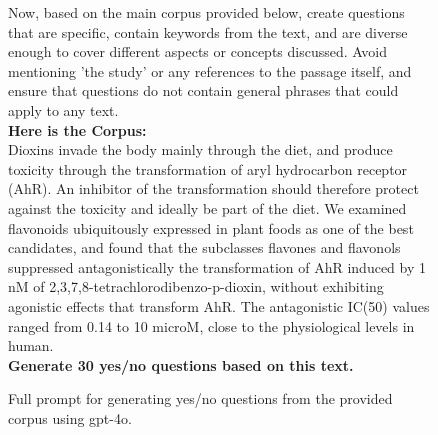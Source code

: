 \begin{figure*}[ht!]
\begin{tcolorbox}
    Now, based on the main corpus provided below, create questions that are specific, contain keywords from the text, and are diverse enough to cover different aspects or concepts discussed. Avoid mentioning 'the study' or any references to the passage itself, and ensure that questions do not contain general phrases that could apply to any text.\\[1em]

    \textbf{Here is the Corpus:}\\[1em]
    Dioxins invade the body mainly through the diet, and produce toxicity through the transformation of aryl hydrocarbon receptor (AhR). 
    An inhibitor of the transformation should therefore protect against the toxicity and ideally be part of the diet. 
    We examined flavonoids ubiquitously expressed in plant foods as one of the best candidates, and found that the subclasses flavones 
    and flavonols suppressed antagonistically the transformation of AhR induced by 1 nM of 2,3,7,8-tetrachlorodibenzo-p-dioxin, 
    without exhibiting agonistic effects that transform AhR. The antagonistic IC(50) values ranged from 0.14 to 10 microM, close to 
    the physiological levels in human.\\[1em]

    \textbf{Generate 30 yes/no questions based on this text.}

    \end{tcolorbox}
    \caption{Full prompt for generating yes/no questions from the provided corpus using gpt-4o.}
    \label{fig:corpus_question_generation}
\end{figure*}

